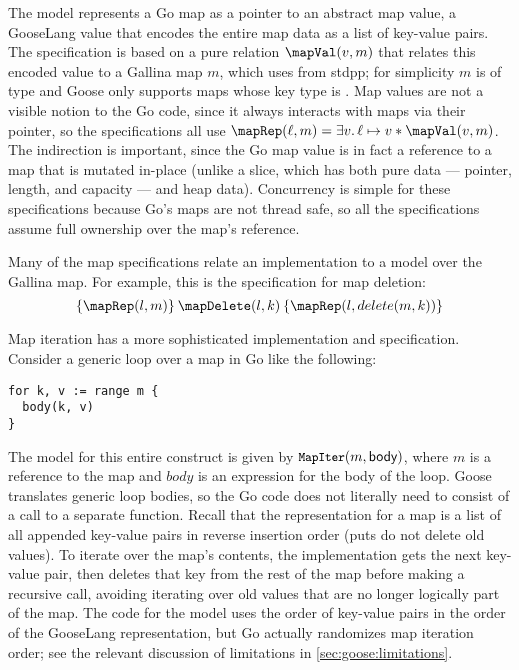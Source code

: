 The model represents
a Go map as a pointer to an abstract map value, a GooseLang value
that encodes the entire map data as a list of key-value pairs. The
specification is based on a pure relation $\mapVal(v, m)$ that relates
this encoded value to a Gallina map $m$, which uses  from
stdpp; for simplicity $m$ is of type  and Goose only supports
maps whose key type is .
Map values are not a visible notion to the Go code, since
it always interacts with maps via their pointer, so the specifications
all use $\mapRep(\ell, m) = \exists v.\, \ell \mapsto v * \mapVal(v, m)$. The
indirection is important, since the Go map value
 is in fact a reference to a map that is
mutated in-place (unlike a slice, which has both pure data --- pointer,
length, and capacity --- and heap data). Concurrency is simple for these
specifications because Go's maps are not thread safe, so all the specifications
assume full ownership over the map's reference.

Many of the map specifications relate an implementation to a model over the
Gallina map. For example, this is the specification for map deletion:
\[
\hoare{\mapRep(l, m)}{\mapDelete(l, k)}{\mapRep(l, delete(m, k))}
\]

Map iteration has a more sophisticated implementation and specification.
Consider a generic loop over a map in Go like the following:

\begin{verbatim}
for k, v := range m {
  body(k, v)
}
\end{verbatim}

The model for this entire construct is given by $\cc{MapIter}(m, \textlog{body})$, where
$m$ is a reference to the map and $body$ is an expression for the body of the
loop. Goose translates generic loop bodies, so the Go code does not literally
need to consist of a call to a separate function. Recall that the representation
for a map is a list of all appended key-value pairs in reverse insertion order
(puts do not delete old values). To iterate over the map's contents, the
implementation gets the next key-value pair, then deletes that key from the rest
of the map before making a recursive call, avoiding iterating over old values
that are no longer logically part of the map. The code for the model uses the
order of key-value pairs in the order of the GooseLang representation, but Go
actually randomizes map iteration order; see the relevant discussion of
limitations in \cref{sec:goose:limitations}.

